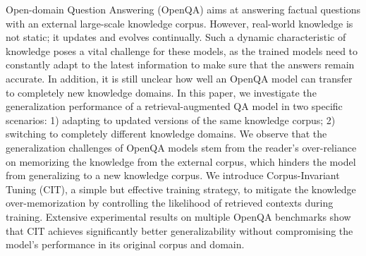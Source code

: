 Open-domain Question Answering (OpenQA) aims at answering factual questions with an external large-scale knowledge corpus. However, real-world knowledge is not static; it updates and evolves continually. Such a dynamic characteristic of knowledge poses a vital challenge for these models, as the trained models need to constantly adapt to the latest information to make sure that the answers remain accurate. In addition, it is still unclear how well an OpenQA model can transfer to completely new knowledge domains. In this paper, we investigate the generalization performance of a retrieval-augmented QA model in two specific scenarios: 1) adapting to updated versions of the same knowledge corpus;  2) switching to completely different knowledge domains. We observe that the generalization challenges of OpenQA models stem from the reader's over-reliance on memorizing the knowledge from the external corpus, which hinders the model from generalizing to a new knowledge corpus. We introduce Corpus-Invariant Tuning (CIT), a simple but effective training strategy, to mitigate the knowledge over-memorization by controlling the likelihood of retrieved contexts during training. Extensive experimental results on multiple OpenQA benchmarks show that CIT achieves significantly better generalizability without compromising the model's performance in its original corpus and domain.